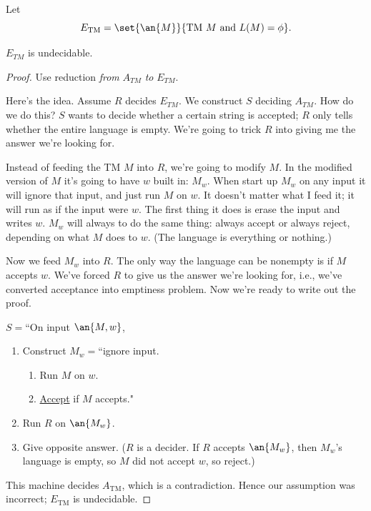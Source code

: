Let
\[
E_{\text{TM}}=\set{\an{M}}{\text{TM }M\text{ and }L(M)=\phi}.
\]
\begin{thm}
$E_{TM}$ is undecidable.
\end{thm}
\begin{proof}
Use reduction {\it from} $A_{TM}$ {\it to} $E_{TM}$. %

Here's the idea. Assume $R$ decides $E_{TM}$. We construct $S$ deciding $A_{TM}$. 
How do we do this? $S$ wants to decide whether a certain string is accepted; $R$ only tells whether the entire language is empty.
We're going to trick $R$ into giving me the answer we're looking for. 

Instead of feeding the TM $M$ into $R$, we're going to modify $M$. In the modified version of $M$ it's going to have $w$ built in: $M_w$. When start up $M_w$ on any input it will ignore that input, and just run $M$ on $w$. It doesn't matter what I feed it; it will run as if the input were $w$. The first thing it does is erase the input and writes $w$. $M_w$ will always to do the same thing: always accept or always reject, depending on what $M$ does to $w$. (The language is everything or nothing.) %

Now we feed $M_w$ into $R$. The only way the language can be nonempty is if $M$ accepts $w$. We've forced $R$ to give us the answer we're looking for, i.e., we've converted acceptance into emptiness problem. Now we're ready to write out the proof.

$S=$``On input $\an{M,w}$,
\begin{enumerate}
\item Construct $M_w=$``ignore input. 
\begin{enumerate}
\item
Run $M$ on $w$.
\item
\ul{Accept} if $M$ accepts."
\end{enumerate}
\item
Run $R$ on $\an{M_w}$.
\item
Give opposite answer.
($R$ is a decider. If $R$ accepts $\an{M_w}$, then $M_w$'s language is empty, so $M$ did not accept $w$, so reject.)
\end{enumerate}
This machine decides $A_{\text{TM}}$, which is a contradiction. Hence our assumption was incorrect; $E_{\text{TM}}$ is undecidable.
\end{proof}
